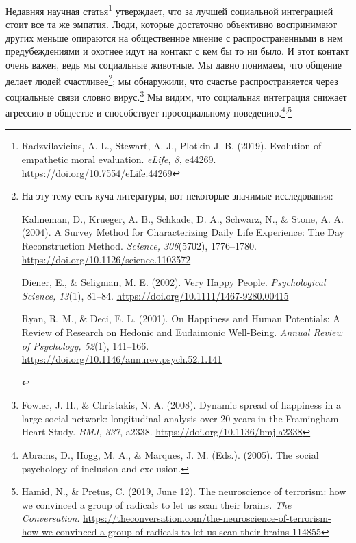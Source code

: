 \documentclass[12pt,a4paper]{report}
\begin{document}
\noindent Недавняя научная статья\footnote{Radzvilavicius, A. L., Stewart, A. J., Plotkin J. B. (2019). Evolution of empathetic moral evaluation. \emph{eLife, 8}, e44269. \url{https://doi.org/10.7554/eLife.44269}} утверждает, что за лучшей социальной интеграцией стоит все та же эмпатия. Люди, которые достаточно объективно воспринимают других меньше опираются на общественное мнение с распространенными в нем предубеждениями и охотнее идут на контакт с кем бы то ни было. И этот контакт очень важен, ведь мы социальные животные. Мы давно понимаем, что общение делает людей счастливее\footnote{На эту тему есть куча литературы, вот некоторые значимые исследования:
\begin{compactitem}
  \item Kahneman, D., Krueger, A. B., Schkade, D. A., Schwarz, N., \& Stone, A. A. (2004). A Survey Method for Characterizing Daily Life Experience: The Day Reconstruction Method. \emph{Science, 306}(5702), 1776–1780. \url{https://doi.org/10.1126/science.1103572}
  \item Diener, E., \& Seligman, M. E. (2002). Very Happy People. \emph{Psychological Science, 13}(1), 81–84. \url{https://doi.org/10.1111/1467-9280.00415}
  \item Ryan, R. M., \& Deci, E. L. (2001). On Happiness and Human Potentials: A Review of Research on Hedonic and Eudaimonic Well-Being. \emph{Annual Review of Psychology, 52}(1), 141–166. \url{https://doi.org/10.1146/annurev.psych.52.1.141}
\end{compactitem}\vspace{-1.3em}}; мы обнаружили, что счастье распространяется через социальные связи словно вирус.\footnote{Fowler, J. H., \& Christakis, N. A. (2008). Dynamic spread of happiness in a large social network: longitudinal analysis over 20 years in the Framingham Heart Study. \emph{BMJ, 337}, a2338. \url{https://doi.org/10.1136/bmj.a2338}} Мы видим, что социальная интеграция снижает агрессию в обществе и способствует просоциальному поведению.\footnote{Abrams, D., Hogg, M. A., \& Marques, J. M. (Eds.). (2005). The social psychology of inclusion and exclusion.}\textsuperscript{,}\footnote{Hamid, N., \& Pretus, C. (2019, June 12). The neuroscience of terrorism: how we convinced a group of radicals to let us scan their brains. \emph{The Conversation}. \url{https://theconversation.com/the-neuroscience-of-terrorism-how-we-convinced-a-group-of-radicals-to-let-us-scan-their-brains-114855}}
\end{document}
